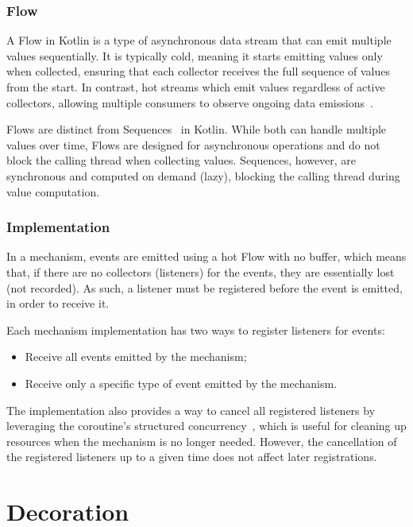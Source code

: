 \subsubsection{Flow}\label{subsubsec:flow}

A Flow in Kotlin is a type of asynchronous data stream that can emit multiple values sequentially.
It is typically cold, meaning it starts emitting values only when collected,
ensuring that each collector receives the full sequence of values from the start.
In contrast, hot streams which emit values regardless of active collectors,
allowing multiple consumers
to observe ongoing data emissions~\cite{android-stateflow-sharedflow, kotlin-flow}.

Flows are distinct from Sequences~\cite{kotlin-sequences} in Kotlin.
While both can handle multiple values over time,
Flows are designed for asynchronous operations and do not block the calling thread when collecting values.
Sequences, however, are synchronous and computed on demand (lazy), blocking the calling thread during value computation.

\subsubsection{Implementation}\label{subsubsec:event-publishing-implementation}

In a mechanism, events are emitted using a hot Flow with no buffer, which means that, if there are no collectors (listeners) for the events, they are essentially lost (not recorded).
As such, a listener must be registered before the event is emitted, in order to receive it.

Each mechanism implementation has two ways to register listeners for events:

\begin{itemize}
    \item Receive all events emitted by the mechanism;
    \item Receive only a specific type of event emitted by the mechanism.
\end{itemize}

The implementation also provides a way to cancel all registered listeners by leveraging the coroutine's structured concurrency~\cite{kotlin-coroutines}, which is useful for cleaning up resources when the mechanism is no longer needed.
However, the cancellation of the registered listeners up to a given time does not affect later registrations.

\section{Decoration}\label{sec:decoration}

